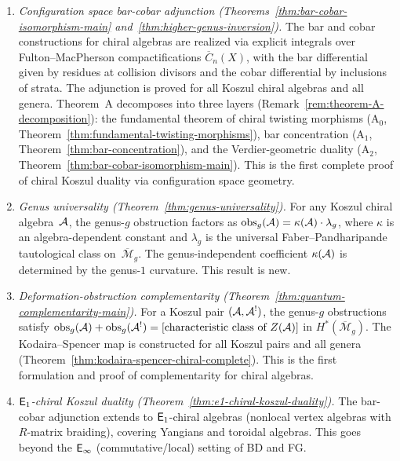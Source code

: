 \begin{enumerate}[label=\emph{(\arabic*)}]

\item \emph{Configuration space bar-cobar adjunction
  (Theorems~\ref{thm:bar-cobar-isomorphism-main}
  and~\ref{thm:higher-genus-inversion}).}
  The bar and cobar constructions for chiral algebras are realized
  via explicit integrals over Fulton--MacPherson compactifications
  $\overline{C}_n(X)$, with the bar differential given by residues
  at collision divisors and the cobar differential by inclusions
  of strata.  The adjunction is proved for all Koszul chiral algebras
  and all genera.  Theorem~A decomposes into three layers
  (Remark~\ref{rem:theorem-A-decomposition}):
  the fundamental theorem of chiral twisting morphisms
  ($\mathrm{A}_0$, Theorem~\ref{thm:fundamental-twisting-morphisms}),
  bar concentration
  ($\mathrm{A}_1$, Theorem~\ref{thm:bar-concentration}), and
  the Verdier-geometric duality
  ($\mathrm{A}_2$, Theorem~\ref{thm:bar-cobar-isomorphism-main}).
  This is the first complete proof of chiral Koszul
  duality via configuration space geometry.

\item \emph{Genus universality
  (Theorem~\ref{thm:genus-universality}).}
  For any Koszul chiral algebra~$\mathcal{A}$, the genus-$g$ obstruction
  factors as $\mathrm{obs}_g(\mathcal{A}) = \kappa(\mathcal{A}) \cdot \lambda_g$,
  where $\kappa$ is an algebra-dependent constant and $\lambda_g$
  is the universal Faber--Pandharipande tautological class
  on~$\overline{\mathcal{M}}_g$.
  The genus-independent coefficient $\kappa(\mathcal{A})$ is determined
  by the genus-$1$ curvature.  This result is new.

\item \emph{Deformation-obstruction complementarity
  (Theorem~\ref{thm:quantum-complementarity-main}).}
  For a Koszul pair $(\mathcal{A}, \mathcal{A}^!)$, the genus-$g$ obstructions
  satisfy $\mathrm{obs}_g(\mathcal{A}) + \mathrm{obs}_g(\mathcal{A}^!) =
  [\text{characteristic class of } Z(\mathcal{A})]$ in $H^*(\overline{\mathcal{M}}_g)$.
  The Kodaira--Spencer map is constructed for all Koszul pairs
  and all genera (Theorem~\ref{thm:kodaira-spencer-chiral-complete}).
  This is the first formulation and proof of complementarity
  for chiral algebras.

\item \emph{$\mathsf{E}_1$-chiral Koszul duality
  (Theorem~\ref{thm:e1-chiral-koszul-duality}).}
  The bar-cobar adjunction extends to $\mathsf{E}_1$-chiral algebras
  (nonlocal vertex algebras with $R$-matrix braiding), covering
  Yangians and toroidal algebras.  This goes beyond the
  $\mathsf{E}_{\infty}$ (commutative/local) setting of BD and FG.


\end{enumerate}
